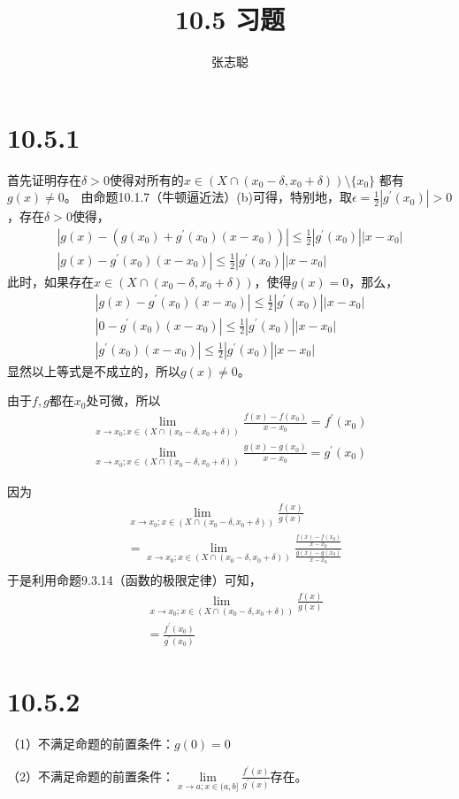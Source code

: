 \documentclass{article}
\begin{document}
\title{10.5 习题}
\author{张志聪}
\maketitle

\section*{10.5.1}

首先证明存在$\delta > 0$使得对所有的$x \in \left( X \cap (x_0 - \delta, x_0 + \delta) \right) \setminus \{x_0\}$
都有$g(x) \neq 0$。
由命题10.1.7（牛顿逼近法）(b)可得，特别地，取$\epsilon = \frac{1}{2}|g^\prime(x_0)| > 0$，存在$\delta > 0$使得，
\begin{align*}
  |g(x) - (g(x_0) + g^\prime(x_0)(x - x_0))| \leq \frac{1}{2}|g^\prime(x_0)||x - x_0| \\
  |g(x) - g^\prime(x_0)(x - x_0)| \leq \frac{1}{2}|g^\prime(x_0)||x - x_0|
\end{align*}
此时，如果存在$x \in (X \cap (x_0 - \delta, x_0 + \delta))$，使得$g(x) = 0$，那么，
\begin{align*}
  |g(x) - g^\prime(x_0)(x - x_0)| \leq \frac{1}{2}|g^\prime(x_0)||x - x_0| \\
  |0 - g^\prime(x_0)(x - x_0)| \leq \frac{1}{2}|g^\prime(x_0)||x - x_0|    \\
  |g^\prime(x_0)(x - x_0)| \leq \frac{1}{2}|g^\prime(x_0)||x - x_0|
\end{align*}
显然以上等式是不成立的，所以$g(x) \neq 0$。

由于$f, g$都在$x_0$处可微，所以
\begin{align*}
  \lim\limits_{x \to x_0; x \in (X \cap (x_0 - \delta, x_0 + \delta))} \frac{f(x) - f(x_0)}{x - x_0} = f^\prime(x_0) \\
  \lim\limits_{x \to x_0; x \in (X \cap (x_0 - \delta, x_0 + \delta))} \frac{g(x) - g(x_0)}{x - x_0} = g^\prime(x_0)
\end{align*}

因为
\begin{align*}
   & \lim\limits_{x \to x_0; x \in (X \cap (x_0 - \delta, x_0 + \delta))} \frac{f(x)}{g(x)}                                                       \\
   & =   \lim\limits_{x \to x_0; x \in (X \cap (x_0 - \delta, x_0 + \delta))} \frac{\frac{f(x) - f(x_0)}{x - x_0}}{\frac{g(x) - g(x_0)}{x - x_0}} \\
\end{align*}
于是利用命题9.3.14（函数的极限定律）可知，
\begin{align*}
   & \lim\limits_{x \to x_0; x \in (X \cap (x_0 - \delta, x_0 + \delta))} \frac{f(x)}{g(x)} \\
   & = \frac{f^\prime(x_0)}{g^\prime(x_0)}
\end{align*}

\section*{10.5.2}

（1）不满足命题的前置条件：$g(0) = 0$

（2）不满足命题的前置条件：$\lim\limits_{x \to a; x \in (a, b]} \frac{f^\prime(x)}{g^\prime(x)}$存在。
\end{document}
